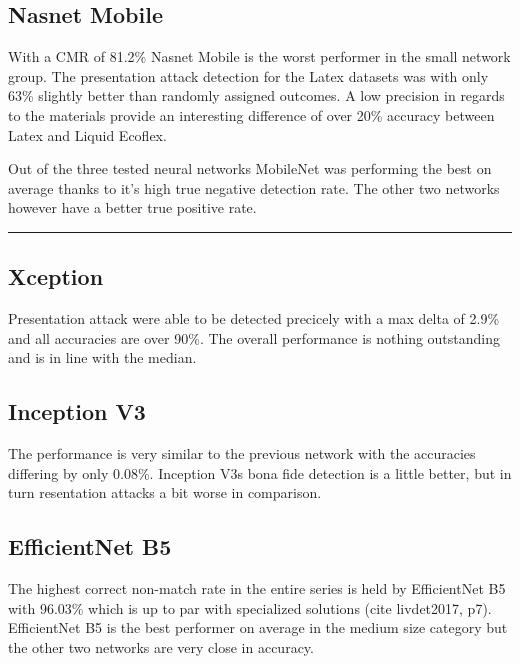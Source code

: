 



\subsection{Nasnet Mobile}

With a CMR of 81.2\% Nasnet Mobile is the worst performer in the small network group.
The presentation attack detection for the Latex datasets was with only 63\% slightly better than randomly assigned outcomes.
A low precision in regards to the materials provide an interesting difference of over 20\% accuracy between Latex and Liquid Ecoflex.



\medskip
Out of the three tested neural networks MobileNet was performing the best on average thanks to it's high true negative detection rate.
The other two networks however have a better true positive rate.
\bigskip\hrule



\subsection{Xception}
    Presentation attack were able to be detected precicely with a max delta of 2.9\% and all accuracies are over 90\%.
    The overall performance is nothing outstanding and is in line with the median.




\subsection{Inception V3}

    The performance is very similar to the previous network with the accuracies differing by only 0.08\%.
    Inception V3s bona fide detection is a little better, but in turn resentation attacks a bit worse in comparison.




\subsection{EfficientNet B5}

    The highest correct non-match rate in the entire series is held by EfficientNet B5 with 96.03\% which is up to par with specialized solutions (cite livdet2017, p7).
    EfficientNet B5 is the best performer on average in the medium size category but the other two networks are very close in accuracy.


